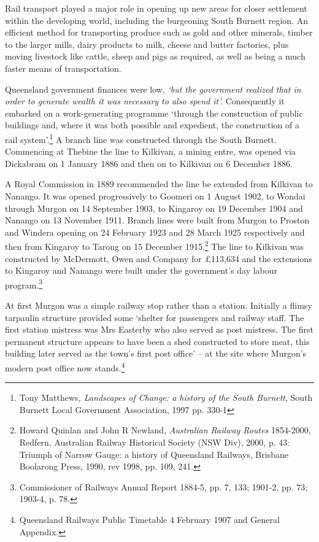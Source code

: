 Rail transport played a major role in opening up new areas for closer settlement within the developing world, including the burgeoning South Burnett region. An efficient method for transporting produce such as gold and other minerals, timber to the larger mills, dairy products to milk, cheese and butter factories, plus moving livestock like cattle, sheep and pigs as required, as well as being a much faster means of transportation.



Queensland government finances were low, \emph{`but the government realized that in order to generate wealth it was necessary to also spend it'.} Consequently it embarked on a work-generating programme `through the construction of public buildings and, where it was both possible and expedient, the construction of a rail system'.\footnote{Tony Matthews\emph{, Landscapes of Change: a history of the South Burnett}, South Burnett Local Government Association, 1997 pp. 330-1} A branch line was constructed through the South Burnett. Commencing at Thebine the line to Kilkivan, a mining entre, was opened via Dickabram on 1 January 1886 and then on to Kilkivan on 6 December 1886.


A Royal Commission in 1889 recommended the line be extended from Kilkivan to Nanango. It was opened progressively to Goomeri on 1 August 1902, to Wondai through Murgon on 14 September 1903, to Kingaroy on 19 December 1904 and Nanango on 13 November 1911. Branch lines were built from Murgon to Proston and Windera opening on 24 February 1923 and 28 March 1925 respectively and then from Kingaroy to Tarong on 15 December 1915.\footnote{Howard Quinlan and John R Newland, \emph{Australian Railway Routes} 1854-2000, Redfern, Australian Railway Historical Society (NSW Div), 2000, p. 43: Triumph of Narrow Gauge: a history of Queensland Railways, Brisbane Boolarong Press, 1990, rev 1998, pp. 109, 241.} The line to Kilkivan was constructed by McDermott, Owen and Company for \pounds113,634 and the extensions to Kingaroy and Nanango were built under the government's day labour program.\footnote{Commissioner of Railways Annual Report 1884-5, pp. 7, 133; 1901-2, pp. 73; 1903-4, p. 78.}


At first Murgon was a simple railway stop rather than a station. Initially a flimsy tarpaulin structure provided some `shelter for passengers and railway staff. The first station mistress was Mrs Easterby who also served as post mistress. The first permanent structure appears to have been a shed constructed to store meat, this building later served as the town's first post office' -- at the site where Murgon's modern post office now stands.\footnote{Queensland Railways Public Timetable 4 February 1907 and General Appendix.}



